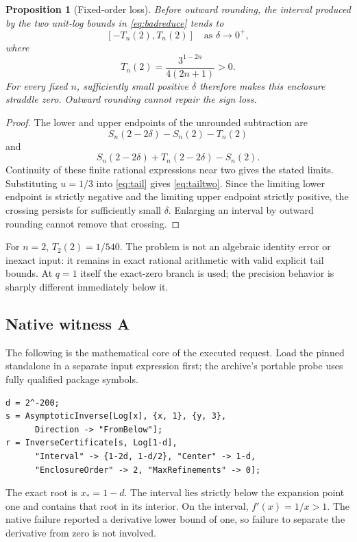 \documentclass[11pt,letterpaper]{article}
\newtheorem{proposition}{Proposition}[section]
\theoremstyle{remark}\newtheorem{remark}[proposition]{Remark}
\begin{document}
\begin{proposition}[Fixed-order loss]\label{prop:loss}
Before outward rounding, the interval produced by the two unit-log
bounds in \eqref{eq:badreduce} tends to
\[
 [-T_n(2),T_n(2)]\quad\text{as }\delta\to0^+,
\]
where
\begin{equation}\label{eq:tailtwo}
 T_n(2)=\frac{3^{1-2n}}{4(2n+1)}>0.
\end{equation}
For every fixed $n$, sufficiently small positive $\delta$ therefore makes
this enclosure straddle zero. Outward rounding cannot repair the sign loss.
\end{proposition}
\begin{proof}
The lower and upper endpoints of the unrounded subtraction are
\[
 S_n(2-2\delta)-S_n(2)-T_n(2)
\]
and
\[
 S_n(2-2\delta)+T_n(2-2\delta)-S_n(2).
\]
Continuity of these finite rational expressions near two gives the stated
limits. Substituting $u=1/3$ into \eqref{eq:tail} gives
\eqref{eq:tailtwo}. Since the limiting lower endpoint is strictly negative
and the limiting upper endpoint strictly positive, the crossing persists
for sufficiently small $\delta$. Enlarging an interval by outward rounding
cannot remove that crossing.
\end{proof}

For $n=2$, $T_2(2)=1/540$. The problem is not an algebraic identity error or
inexact input: it remains in exact rational arithmetic with valid explicit
tail bounds. At $q=1$ itself the exact-zero branch is used; the precision
behavior is sharply different immediately below it.

\subsection{Native witness A}
The following is the mathematical core of the executed request. Load the
pinned standalone in a separate input expression first; the archive's
portable probe uses fully qualified package symbols.
\begin{lstlisting}
d = 2^-200;
s = AsymptoticInverse[Log[x], {x, 1}, {y, 3},
      Direction -> "FromBelow"];
r = InverseCertificate[s, Log[1-d],
      "Interval" -> {1-2d, 1-d/2}, "Center" -> 1-d,
      "EnclosureOrder" -> 2, "MaxRefinements" -> 0];
\end{lstlisting}
The exact root is $x_*=1-d$. The interval lies strictly below the expansion
point one and contains that root in its interior. On the interval,
$f'(x)=1/x>1$. The native failure reported a derivative lower bound of one,
so failure to separate the derivative from zero is not involved.
\end{document}
